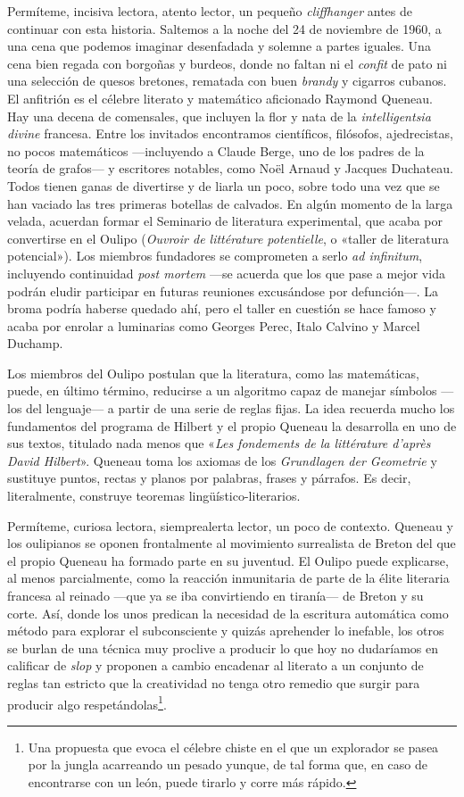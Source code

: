 \documentclass[11pt,a4paper]{article}
\begin{document}
Permíteme, incisiva lectora, atento lector, un pequeño \emph{cliffhanger} antes de continuar con esta historia. Saltemos a la noche del 24 de noviembre de 1960, a una cena que podemos imaginar desenfadada y solemne a partes iguales. Una cena bien regada con borgoñas y burdeos, donde no faltan ni el \emph{confit} de pato ni una selección de quesos bretones, rematada con buen \emph{brandy} y cigarros cubanos. El anfitrión es el célebre literato y matemático aficionado Raymond Queneau. Hay una decena de comensales, que incluyen la flor y nata de la \emph{intelligentsia divine} francesa. Entre los invitados encontramos científicos, filósofos, ajedrecistas, no pocos matemáticos ---incluyendo a Claude Berge, uno de los padres de la teoría de grafos--- y escritores notables, como Noël Arnaud y Jacques Duchateau. Todos tienen ganas de divertirse y de liarla un poco, sobre todo una vez que se han vaciado las tres primeras botellas de calvados. En algún momento de la larga velada, acuerdan formar el Seminario de literatura experimental, que acaba por convertirse en el Oulipo (\emph{Ouvroir de littérature potentielle}, o «taller de literatura potencial»). Los miembros fundadores se comprometen a serlo \emph{ad infinitum}, incluyendo continuidad \emph{post mortem} ---se acuerda que los que pase a mejor vida podrán eludir participar en futuras reuniones excusándose por defunción---. La broma podría haberse quedado ahí, pero el taller en cuestión se hace famoso y acaba por enrolar a luminarias como Georges Perec, Italo Calvino y Marcel Duchamp.

Los miembros del Oulipo postulan que la literatura, como las matemáticas, puede, en último término, reducirse a un algoritmo capaz de manejar símbolos ---los del lenguaje--- a partir de una serie de reglas fijas. La idea recuerda mucho los fundamentos del programa de Hilbert y el propio Queneau la desarrolla en uno de sus textos, titulado nada menos que «\emph{Les fondements de la littérature d'après David Hilbert}». Queneau toma los axiomas de los \emph{Grundlagen der Geometrie} y sustituye puntos, rectas y planos por palabras, frases y párrafos. Es decir, literalmente, construye teoremas lingüístico-literarios.

Permíteme, curiosa lectora, siemprealerta lector, un poco de contexto. Queneau y los oulipianos se oponen frontalmente al movimiento surrealista de Breton del que el propio Queneau ha formado parte en su juventud. El Oulipo puede explicarse, al menos parcialmente, como la reacción inmunitaria de parte de la élite literaria francesa al reinado ---que ya se iba convirtiendo en tiranía--- de Breton y su corte. Así, donde los unos predican la necesidad de la escritura automática como método para explorar el subconsciente y quizás aprehender lo inefable, los otros se burlan de una técnica muy proclive a producir lo que hoy no dudaríamos en calificar de \emph{slop} y proponen a cambio encadenar al literato a un conjunto de reglas tan estricto que la creatividad no tenga otro remedio que surgir para producir algo respetándolas\footnote{Una propuesta que evoca el célebre chiste en el que un explorador se pasea por la jungla acarreando un pesado yunque, de tal forma que, en caso de encontrarse con un león, puede tirarlo y corre más rápido.}.
\end{document}

